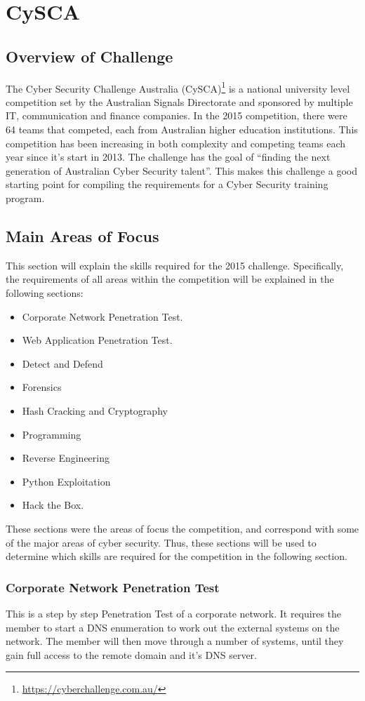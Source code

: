 \documentclass[a4paper,11pt]{report}
\begin{document}
\chapter{CySCA}
	\section{Overview of Challenge}
		The Cyber Security Challenge Australia (CySCA)\footnote{\url{https://cyberchallenge.com.au/}} is a national university level competition set by the Australian Signals Directorate 
		and sponsored by multiple IT, communication and finance companies. 
		In the 2015 competition, there were 64 teams that competed, each from Australian higher education institutions. 
		This competition has been increasing in both complexity and competing teams each year since it's start in 2013. 
		The challenge has the goal of ``finding the next generation of Australian Cyber Security talent''.
		This makes this challenge a good starting point for compiling the requirements for a Cyber Security training program. 
	\section{Main Areas of Focus}
		This section will explain the skills required for the 2015 challenge. 
		Specifically, the requirements of all areas within the competition will be explained in the following sections:
		\begin{itemize}
			\item Corporate Network Penetration Test.
			\item Web Application Penetration Test. 
			\item Detect and Defend
			\item Forensics
			\item Hash Cracking and Cryptography
			\item Programming
			\item Reverse Engineering
			\item Python Exploitation
			\item Hack the Box. 
		\end{itemize}
		These sections were the areas of focus the competition, and correspond with some of the major areas of cyber security.
		Thus, these sections will be used to determine which skills are required for the competition in the following section. 
		\subsection{Corporate Network Penetration Test}
			This is a step by step Penetration Test of a corporate network. 
			It requires the member to start a DNS enumeration to work out the external systems on the network. 
			The member will then move through a number of systems, 
			until they gain full access to the remote domain and it's DNS server. 
\end{document}

